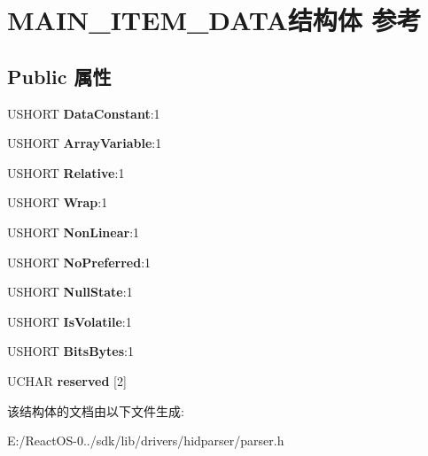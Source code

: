 \hypertarget{struct_m_a_i_n___i_t_e_m___d_a_t_a}{}\section{M\+A\+I\+N\+\_\+\+I\+T\+E\+M\+\_\+\+D\+A\+T\+A结构体 参考}
\label{struct_m_a_i_n___i_t_e_m___d_a_t_a}
\subsection*{Public 属性}
\begin{DoxyCompactItemize}
\item 
\mbox{\label{struct_m_a_i_n___i_t_e_m___d_a_t_a_a0128cd97b48a4e5c068ea13370ddceae}} 
U\+S\+H\+O\+RT {\bfseries Data\+Constant}\+:1
\item 
\mbox{\label{struct_m_a_i_n___i_t_e_m___d_a_t_a_acc08aa1ae6f9a166917f59682a760052}} 
U\+S\+H\+O\+RT {\bfseries Array\+Variable}\+:1
\item 
\mbox{\label{struct_m_a_i_n___i_t_e_m___d_a_t_a_a9f8411f0dbb7bc1f667d65345cfe5eb3}} 
U\+S\+H\+O\+RT {\bfseries Relative}\+:1
\item 
\mbox{\label{struct_m_a_i_n___i_t_e_m___d_a_t_a_a5b633fa39df482518ad969c5ecf681c1}} 
U\+S\+H\+O\+RT {\bfseries Wrap}\+:1
\item 
\mbox{\label{struct_m_a_i_n___i_t_e_m___d_a_t_a_a8b57dc9250e87b29bde1cd59e520f3c5}} 
U\+S\+H\+O\+RT {\bfseries Non\+Linear}\+:1
\item 
\mbox{\label{struct_m_a_i_n___i_t_e_m___d_a_t_a_a7685c9f189c001ce12dcc18240881f5a}} 
U\+S\+H\+O\+RT {\bfseries No\+Preferred}\+:1
\item 
\mbox{\label{struct_m_a_i_n___i_t_e_m___d_a_t_a_a31c4739301883f1b09131a6fd993ae51}} 
U\+S\+H\+O\+RT {\bfseries Null\+State}\+:1
\item 
\mbox{\label{struct_m_a_i_n___i_t_e_m___d_a_t_a_aab2aea8baeb76cad518cb7a6ccc7d069}} 
U\+S\+H\+O\+RT {\bfseries Is\+Volatile}\+:1
\item 
\mbox{\label{struct_m_a_i_n___i_t_e_m___d_a_t_a_af001172240fd1a3f7247b08fd8460dad}} 
U\+S\+H\+O\+RT {\bfseries Bits\+Bytes}\+:1
\item 
\mbox{\label{struct_m_a_i_n___i_t_e_m___d_a_t_a_a44968136388fb4111f569987cc00dee4}} 
U\+C\+H\+AR {\bfseries reserved} \mbox{[}2\mbox{]}
\end{DoxyCompactItemize}


该结构体的文档由以下文件生成\+:\begin{DoxyCompactItemize}
\item 
E\+:/\+React\+O\+S-\/0../sdk/lib/drivers/hidparser/parser.\+h\end{DoxyCompactItemize}

